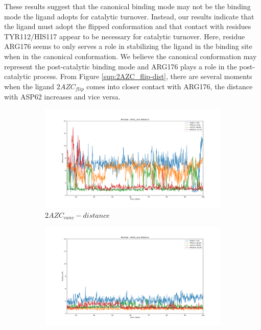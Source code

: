 \documentclass[fleqn,10pt]{wlscirep}
\begin{document}
These results suggest that the canonical binding mode may not be the binding mode the ligand adopts for catalytic turnover.
Instead, our results indicate that the ligand must adopt the flipped conformation and that contact with residues TYR112/HIS117 appear to be necessary for catalytic turnover.
Here, residue ARG176 seems to only serves a role in stabilizing the ligand in the binding site when in the canonical conformation.
We believe the canonical conformation may represent the post-catalytic binding mode and ARG176 plays a role in the post-catalytic process.
From Figure \ref{sup:2AZC_flip-dist}, there are several moments when the ligand $2AZC_{flip}$ comes into closer contact with ARG176, the distance with ASP62 increases and vice versa.

\begin{figure}[!ht]
\centering
   \begin{subfigure}{.45\textwidth}
     \centering
     \includegraphics[width=.95\linewidth]{2AZC_canc/2AZC_canc-dist_3.png}
     \caption{$2AZC_{canc}-distance$}
     \label{fig:2AZC_canc-dist}
   \end{subfigure}
   \begin{subfigure}{.45\textwidth}
     \centering
     \includegraphics[width=.95\linewidth]{2AZU_canc/2AZU_canc-dist_4.png}

\end{subfigure}
\end{figure}
\end{document}
